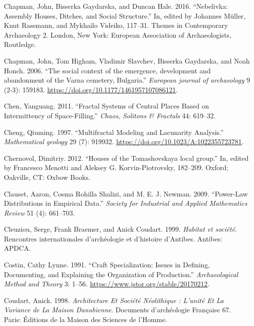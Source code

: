 \documentclass[
  12pt,
  a4paper, twoside]{book}
\newlength{\cslhangindent}
\newlength{\cslentryspacingunit} %
\newenvironment{CSLReferences}[2] %
 {%
  \setlength{\parindent}{0pt}
  \ifodd #1
  \let\oldpar\par
  \def\par{\hangindent=\cslhangindent\oldpar}
  \fi
  \setlength{\parskip}{#2\cslentryspacingunit}
 }%
 {}
\begin{document}
\begin{CSLReferences}{1}{0}
\leavevmode{}%
Chapman, John, Bisserka Gaydarska, and Duncan Hale. 2016. {``Nebelivka: Assembly Houses, Ditches, and Social Structure.''} In, edited by Johannes Müller, Knut Rassmann, and Mykhailo Videiko, 117--31. Themes in Contemporary Archaeology 2. London, New York: European Association of Archaeologists, Routledge.

\leavevmode{}%
Chapman, John, Tom Higham, Vladimir Slavchev, Bisserka Gaydarska, and Noah Honch. 2006. {``The social context of the emergence, development and abandonment of the Varna cemetery, Bulgaria.''} \emph{European journal of archaeology} 9 (2-3): 159183. \url{https://doi.org/10.1177/1461957107086121}.

\leavevmode{}%
Chen, Yanguang. 2011. {``Fractal Systems of Central Places Based on Intermittency of Space-Filling.''} \emph{Chaos, Solitons \& Fractals} 44: 619--32.

\leavevmode{}%
Cheng, Qiuming. 1997. {``Multifractal Modeling and Lacunarity Analysis.''} \emph{Mathematical geology} 29 (7): 919932. \url{https://doi.org/10.1023/A:1022355723781}.

\leavevmode{}%
Chernovol, Dimitriy. 2012. {``Houses of the Tomashovskaya local group.''} In, edited by Francesco Menotti and Aleksey G. Korvin-Piotrovsky, 182--209. Oxford; Oakville, CT: Oxbow Books.

\leavevmode{}%
Clauset, Aaron, Cosma Rohilla Shalizi, and M. E. J. Newman. 2009. {``Power-Law Distributions in Empirical Data.''} \emph{Society for Industrial and Applied Mathematics Review} 51 (4): 661--703.

\leavevmode{}%
Cleuziou, Serge, Frank Braemer, and Anick Coudart. 1999. \emph{Habitat et société}. Rencontres internationales d'archéologie et d'histoire d'Antibes. Antibes: APDCA.

\leavevmode{}%
Costin, Cathy Lynne. 1991. {``Craft Specialization: Issues in Defining, Documenting, and Explaining the Organization of Production.''} \emph{Archaeological Method and Theory} 3: 1--56. \url{https://www.jstor.org/stable/20170212}.

\leavevmode{}%
Coudart, Anick. 1998. \emph{Architecture Et Société Néolithique : L'unité Et La Variance de La Maison Danubienne}. Documents d'archéologie Française 67. Paris: Éditions de la Maison des Sciences de l'Homme.


\end{CSLReferences}
\end{document}

